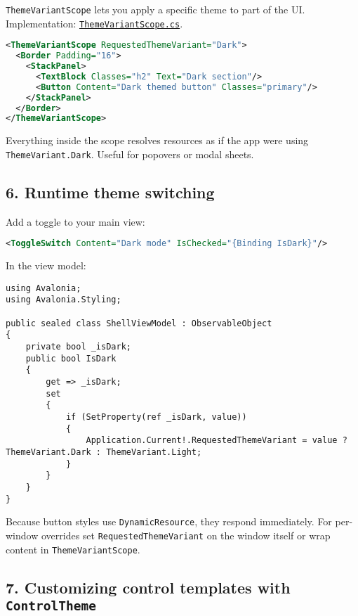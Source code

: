 \passthrough{\lstinline!ThemeVariantScope!} lets you apply a specific
theme to part of the UI. Implementation:
\href{https://github.com/AvaloniaUI/Avalonia/blob/master/src/Avalonia.Controls/ThemeVariantScope.cs}{\passthrough{\lstinline!ThemeVariantScope.cs!}}.

\begin{lstlisting}[language=XML]
<ThemeVariantScope RequestedThemeVariant="Dark">
  <Border Padding="16">
    <StackPanel>
      <TextBlock Classes="h2" Text="Dark section"/>
      <Button Content="Dark themed button" Classes="primary"/>
    </StackPanel>
  </Border>
</ThemeVariantScope>
\end{lstlisting}

Everything inside the scope resolves resources as if the app were using
\passthrough{\lstinline!ThemeVariant.Dark!}. Useful for popovers or
modal sheets.

\subsection{6. Runtime theme switching}\label{runtime-theme-switching}

Add a toggle to your main view:

\begin{lstlisting}[language=XML]
<ToggleSwitch Content="Dark mode" IsChecked="{Binding IsDark}"/>
\end{lstlisting}

In the view model:

\begin{lstlisting}
using Avalonia;
using Avalonia.Styling;

public sealed class ShellViewModel : ObservableObject
{
    private bool _isDark;
    public bool IsDark
    {
        get => _isDark;
        set
        {
            if (SetProperty(ref _isDark, value))
            {
                Application.Current!.RequestedThemeVariant = value ? ThemeVariant.Dark : ThemeVariant.Light;
            }
        }
    }
}
\end{lstlisting}

Because button styles use \passthrough{\lstinline!DynamicResource!},
they respond immediately. For per-window overrides set
\passthrough{\lstinline!RequestedThemeVariant!} on the window itself or
wrap content in \passthrough{\lstinline!ThemeVariantScope!}.

\subsection{\texorpdfstring{7. Customizing control templates with
\texttt{ControlTheme}}{7. Customizing control templates with ControlTheme}}\label{customizing-control-templates-with-controltheme}

